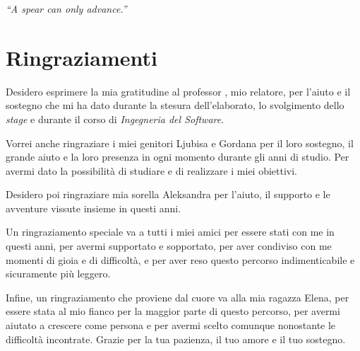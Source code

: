 \cleardoublepage
{}
{}

 \begin{flushright}{
     \slshape
     ``A spear can only advance.''} \\
     \medskip
     
 \end{flushright}

\begingroup
\let\clearpage\relax
\let\cleardoublepage\relax
\let\cleardoublepage\relax

\chapter*{Ringraziamenti}

\noindent Desidero esprimere la mia gratitudine al professor \myProf, mio relatore, per l'aiuto e il sostegno che mi ha dato durante la stesura dell'elaborato, lo svolgimento dello \textit{stage} e durante il corso di \textit{Ingegneria del Software}.

\vspace{0.35cm}

\noindent Vorrei anche ringraziare i miei genitori Ljubisa e Gordana per il loro sostegno, il grande aiuto e la loro presenza in ogni momento durante gli anni di studio. Per avermi dato la possibilità di studiare e di realizzare i miei obiettivi.

\vspace{0.35cm}

\noindent Desidero poi ringraziare mia sorella Aleksandra per l'aiuto, il supporto e le avventure vissute insieme in questi anni.

\vspace{0.75cm}

\noindent Un ringraziamento speciale va a tutti i miei amici per essere stati con me in questi anni, per avermi supportato e sopportato, per aver condiviso con me momenti di gioia e di difficoltà, e per aver reso questo percorso indimenticabile e sicuramente più leggero.

\vspace{0.35cm}

\noindent Infine, un ringraziamento che proviene dal cuore va alla mia ragazza Elena, per essere stata al mio fianco per la maggior parte di questo percorso, per avermi aiutato a crescere come persona e per avermi scelto comunque nonostante le difficoltà incontrate. Grazie per la tua pazienza, il tuo amore e il tuo sostegno.
\hfill \textit{\myName}

\endgroup
